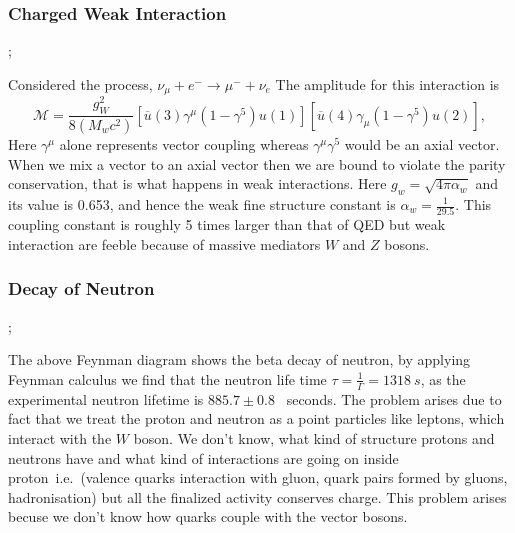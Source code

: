 \subsubsection{Charged Weak Interaction}
\begin{center}
;
\end{center}
Considered the process,
$\nu_{\mu}+e^{-}\rightarrow\mu^{-}+\nu_{e}$
The amplitude for this interaction is
\begin{equation}
\mathcal{M}=\frac{g_{W}^{2}}{8(M_{w}c^{2})}[\overline{u}(3)\gamma^{\mu}(1-\gamma^{5})u(1)][\overline{u}(4)\gamma_{\mu}(1-\gamma^{5})u(2)],
\end{equation}
Here $\gamma^{\mu}$ alone represents vector coupling whereas $\gamma^{\mu}\gamma^{5}$ would be an axial vector. When we mix a vector to an axial vector then we are bound to violate the parity conservation, that is what happens in weak interactions. Here $g_{w}=\sqrt{4\pi\alpha_{w}}$ and its value is 0.653, and hence the weak fine structure constant is $\alpha_{w}=\frac{1}{29.5}$. This coupling constant is roughly 5 times larger than that of QED but weak interaction are feeble because of massive mediators $W$ and $Z$ bosons.

\subsubsection{Decay of Neutron}
\begin{center}
;
\end{center}

The above Feynman diagram shows the beta decay of neutron, by applying Feynman calculus we find that the neutron life time $\tau=\frac{1}{\Gamma}=1318~s$, as the experimental neutron lifetime is $885.7\pm0.8$~\cite{serebrov2019neutron} seconds. The problem arises due to fact that we treat the proton and neutron as a point particles like leptons, which interact with the $W$ boson. We don't know, what kind of structure protons and neutrons have and what kind of interactions are going on inside proton~i.e.~(valence quarks interaction with gluon, quark pairs formed by gluons, hadronisation) but all  the finalized activity conserves charge. This problem arises becuse we don't know how quarks couple with the vector bosons.
